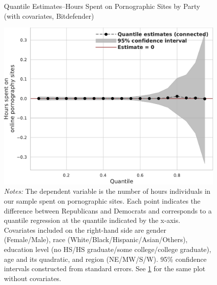 \documentclass[12pt, letterpaper]{article}
\begin{document}
\begin{figure}[ht]
	\centering
	\caption{Quantile Estimates--Hours Spent on Pornographic Sites by Party (with covariates, Bitdefender)}
	\includegraphics[width=.55\linewidth]{figs/alphamountain_quantile_reg_covariates_duration_adult.pdf}
	\caption*{\footnotesize \emph{Notes:} 
		The dependent variable is the number of hours individuals in our sample spent on pornographic sites.
		Each point indicates the difference between Republicans and Democrats and corresponds to a quantile regression at the quantile indicated by the x-axis.
		Covariates included on the right-hand side are gender (Female/Male), race (White/Black/Hispanic/Asian/Others), education level (no HS/HS graduate/some college/college graduate), age and its quadratic, and region (NE/MW/S/W).
		95\% confidence intervals constructed from standard errors.
		See \cref{fig:alphamountain_quantile_regression_duration_covariates} for the same plot without covariates.
	}
	\label{fig:alphamountain_quantile_regression_duration_covariates}
\end{figure}


\FloatBarrier
\clearpage
\end{document}

